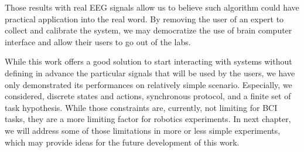 
\transition

Those results with real EEG signals allow us to believe such algorithm could have practical application into the real word. By removing the user of an expert to collect and calibrate the system, we may democratize the use of brain computer interface and allow their users to go out of the labs. 

While this work offers a good solution to start interacting with systems without defining in advance the particular signals that will be used by the users, we have only demonstrated its performances on relatively simple scenario. Especially, we considered, discrete states and actions, synchronous protocol, and a finite set of task hypothesis. While those constraints are, currently, not limiting for BCI tasks, they are a more limiting factor for robotics experiments. In next chapter, we will address some of those limitations in more or less simple experiments, which may provide ideas for the future development of this work.















